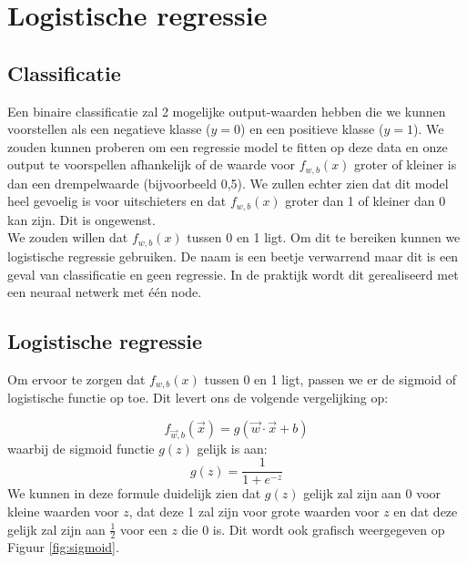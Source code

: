\section{Logistische regressie }

\subsection{Classificatie}
Een binaire classificatie zal 2 mogelijke output-waarden hebben die we kunnen voorstellen als een negatieve klasse ($y = 0$) en een positieve klasse ($y = 1$).  We zouden kunnen proberen om een regressie model te fitten op deze data en onze output te voorspellen afhankelijk of de waarde voor $f_{w,b}(x)$ groter of kleiner is dan een drempelwaarde (bijvoorbeeld 0,5). We zullen echter zien dat dit model heel gevoelig is voor uitschieters en dat $f_{w,b}(x)$ groter dan 1 of kleiner dan 0 kan zijn. Dit is ongewenst.\\
\newline
We zouden willen dat $f_{w,b}(x)$ tussen 0 en 1 ligt. Om dit te bereiken kunnen we logistische regressie gebruiken. De naam is een beetje verwarrend maar dit is een geval van classificatie en geen regressie. In de praktijk wordt dit gerealiseerd met een neuraal netwerk met één node. 

\subsection{Logistische regressie }

Om ervoor te zorgen dat $f_{w,b}(x)$ tussen 0 en 1 ligt, passen we er de sigmoid of logistische functie op toe. Dit levert ons de volgende vergelijking op: 

\begin{equation}
	f_{\vec{w},b}(\vec{x}) = g(\vec{w} \cdot \vec{x} + b)
	\label{eq:f-wb-log}
\end{equation}
waarbij de sigmoid functie $g(z)$ gelijk is aan:
\begin{equation}
	g(z) = \frac{1}{1 + e^{-z}}
\end{equation}
\noindent
We kunnen in deze formule duidelijk zien dat $g(z)$ gelijk zal zijn aan 0 voor kleine waarden voor $z$, dat deze 1 zal zijn voor grote waarden voor $z$ en dat deze gelijk zal zijn aan $\frac{1}{2}$ voor een $z$ die 0 is. Dit wordt ook grafisch weergegeven op Figuur \ref{fig:sigmoid}.

